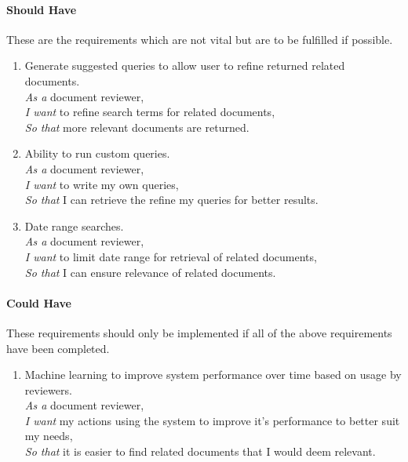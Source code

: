 \documentclass{l4proj}
\begin{document}
\paragraph{Should Have}
These are the requirements which are not vital but are to be fulfilled if possible.
\begin{enumerate}[label=\textbf{S.\arabic*}]
\item Generate suggested queries to allow user to refine returned related documents. \\
\textit{As a} document reviewer, \\
\textit{I want} to refine search terms for related documents, \\
\textit{So that} more relevant documents are returned.
\item Ability to run custom queries. \\
\textit{As a} document reviewer, \\
\textit{I want} to write my own queries, \\
\textit{So that} I can retrieve the refine my queries for better results.
\item Date range searches. \\
\textit{As a} document reviewer, \\
\textit{I want} to limit date range for retrieval of related documents, \\
\textit{So that} I can ensure relevance of related documents.
\end{enumerate}
\paragraph{Could Have}
These requirements should only be implemented if all of the above requirements have been completed.
\begin{enumerate}[label=\textbf{C.\arabic*}]
\item Machine learning to improve system performance over time based on usage by reviewers. \\
\textit{As a} document reviewer, \\
\textit{I want} my actions using the system to improve it’s performance to better suit my needs, \\
\textit{So that} it is easier to find related documents that I would deem relevant.
\end{enumerate}
\end{document}
